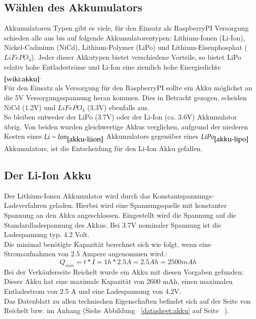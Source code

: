 \documentclass[12pt,a4paper]{article}
\begin{document}
{\subsection{Wählen des Akkumulators}
\label{SUBSEC:CHOOSE-AKKU}

Akkumulatoren Typen gibt es viele, für den Einsatz als RaspberryPI Versorgung schieden alle aus bis auf folgende Akkumulatorentypen: Lithium-Ionen (Li-Ion), Nickel-Cadmium (NiCd),  Lithium-Polymer (LiPo) und Lithium-Eisenphosphat ($LiFePO_4$). Jeder dieser Akkutypen bietet verschiedene Vorteile, so bietet LiPo relativ hohe Entladeströme und Li-Ion eine ziemlich hohe Energiedichte $_{\cite{wiki:akku}}$. \\
Für den Einsatz als Versorgung für den RaspberryPI sollte ein Akku möglichst an die 5V Versorgungsspannung heran kommen. Dies in Betracht gezogen, scheiden NiCd (1.2V) und $LiFePO_4$ (3.3V) ebenfalls aus. \\
So bleiben entweder der LiPo (3.7V) oder der Li-Ion (ca. 3.6V) Akkumulator übrig. Von beiden wurden gleichwertige Akkus verglichen, aufgrund der niederen Kosten eines $Li-Ion_{\cite{akku-liion}}$ Akkumulators gegenüber eines $LiPo_{\cite{akku-lipo}}$ Akkumulators, ist die Entscheidung für den Li-Ion Akku gefallen.

\subsection{Der Li-Ion Akku}
\label{SUBSEC:LIION}

Der Lithium-Ionen Akkumulator wird durch das Konstantspannungs-Ladeverfahren geladen. Hierbei wird eine Spannungsquelle mit konstanter Spannung an den Akku angeschlossen. Eingestellt wird die Spannung auf die Standardladespannung des Akkus. Bei 3.7V nominaler Spannung ist die Ladespannung typ. 4.2 Volt. \\
Die minimal benötigte Kapazität berechnet sich wie folgt, wenn eine Stromaufnahmen von 2.5 Ampere angenommen wird.:
\[Q_{min} = t*I = 1h * 2.5A = 2.5 Ah = 2500 mAh\]
Bei der Verkäuferseite Reichelt wurde ein Akku mit diesen Vorgaben gefunden: \cite{akku-liion}\\
Dieser Akku hat eine maximale Kapazität von 2600 mAh, einen maximalen Entladestrom von 2.5 A und eine Ladespannung von 4.2V. \\[1ex]
Das Datenblatt zu allen technischen Eigenschaften befindet sich auf der Seite von Reichelt bzw. im Anhang (Siehe Abbildung ~\ref{datasheet:akku} auf Seite ~\pageref{datasheet:akku}).

}
\end{document}
